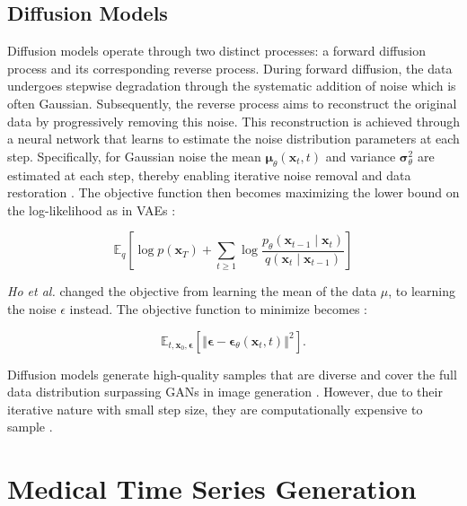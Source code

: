 \subsection{Diffusion Models}

Diffusion models operate through two distinct processes: a forward diffusion process and its corresponding reverse process. During forward diffusion, the data undergoes stepwise degradation through the systematic addition of noise which is often Gaussian. Subsequently, the reverse process aims to reconstruct the original data by progressively removing this noise. This reconstruction is achieved through a neural network that learns to estimate the noise distribution parameters at each step. Specifically, for Gaussian noise the mean \( \mathbf{\mu}_\theta(\mathbf{x}_t, t) \) and variance \( \mathbf{\sigma}^2_\theta \) are estimated at each step, thereby enabling iterative noise removal and data restoration \cite{sohl-dickstein_deep_2015}. The objective function then becomes maximizing the lower bound on the log-likelihood as in VAEs \cite{ho_denoising_2020}:

\begin{equation}
\mathbb{E}_q \left[
    \log p(\mathbf{x}_T) 
    + \sum_{t \geq 1} \log 
    \frac{p_\theta(\mathbf{x}_{t-1} \mid \mathbf{x}_t)}{q(\mathbf{x}_t \mid \mathbf{x}_{t-1})}
\right]
\end{equation}

\noindent \textit{Ho et al.} \cite{ho_denoising_2020} changed the objective from learning the mean of the data \( \mu \), to learning the noise \( \epsilon \) instead. The objective function to minimize becomes \cite{ho_denoising_2020, kazerouni_diffusion_2023}:

\begin{equation}
    \mathbb{E}_{t, \mathbf{x}_0, \mathbf{\epsilon}} \left[
    \left\Vert
    \mathbf{\epsilon} - 
    \mathbf{\epsilon}_\theta \left( \mathbf{x}_t, t \right)
    \right\Vert^2
    \right].
\end{equation}

\noindent Diffusion models generate high-quality samples that are diverse and cover the full data distribution surpassing GANs in image generation \cite{nichol_improved_2021}. However, due to their iterative nature with small step size, they are computationally expensive to sample \cite{xiao_tackling_2022}.
 
\section{Medical Time Series Generation}

